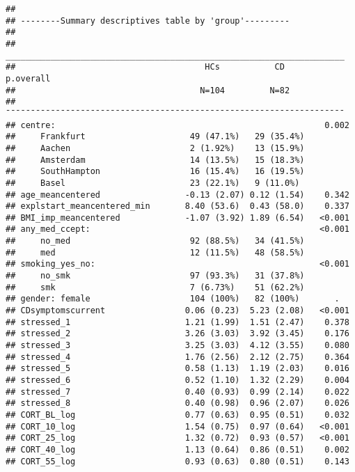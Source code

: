\documentclass[
]{article}
\begin{document}
\begin{verbatim}
## 
## --------Summary descriptives table by 'group'---------
## 
## ____________________________________________________________________ 
##                                      HCs           CD      p.overall 
##                                     N=104         N=82               
## ¯¯¯¯¯¯¯¯¯¯¯¯¯¯¯¯¯¯¯¯¯¯¯¯¯¯¯¯¯¯¯¯¯¯¯¯¯¯¯¯¯¯¯¯¯¯¯¯¯¯¯¯¯¯¯¯¯¯¯¯¯¯¯¯¯¯¯¯ 
## centre:                                                      0.002   
##     Frankfurt                     49 (47.1%)   29 (35.4%)            
##     Aachen                        2 (1.92%)    13 (15.9%)            
##     Amsterdam                     14 (13.5%)   15 (18.3%)            
##     SouthHampton                  16 (15.4%)   16 (19.5%)            
##     Basel                         23 (22.1%)   9 (11.0%)             
## age_meancentered                 -0.13 (2.07) 0.12 (1.54)    0.342   
## explstart_meancentered_min       8.40 (53.6)  0.43 (58.0)    0.337   
## BMI_imp_meancentered             -1.07 (3.92) 1.89 (6.54)   <0.001   
## any_med_ccept:                                              <0.001   
##     no_med                        92 (88.5%)   34 (41.5%)            
##     med                           12 (11.5%)   48 (58.5%)            
## smoking_yes_no:                                             <0.001   
##     no_smk                        97 (93.3%)   31 (37.8%)            
##     smk                           7 (6.73%)    51 (62.2%)            
## gender: female                    104 (100%)   82 (100%)       .     
## CDsymptomscurrent                0.06 (0.23)  5.23 (2.08)   <0.001   
## stressed_1                       1.21 (1.99)  1.51 (2.47)    0.378   
## stressed_2                       3.26 (3.03)  3.92 (3.45)    0.176   
## stressed_3                       3.25 (3.03)  4.12 (3.55)    0.080   
## stressed_4                       1.76 (2.56)  2.12 (2.75)    0.364   
## stressed_5                       0.58 (1.13)  1.19 (2.03)    0.016   
## stressed_6                       0.52 (1.10)  1.32 (2.29)    0.004   
## stressed_7                       0.40 (0.93)  0.99 (2.14)    0.022   
## stressed_8                       0.40 (0.98)  0.96 (2.07)    0.026   
## CORT_BL_log                      0.77 (0.63)  0.95 (0.51)    0.032   
## CORT_10_log                      1.54 (0.75)  0.97 (0.64)   <0.001   
## CORT_25_log                      1.32 (0.72)  0.93 (0.57)   <0.001   
## CORT_40_log                      1.13 (0.64)  0.86 (0.51)    0.002   
## CORT_55_log                      0.93 (0.63)  0.80 (0.51)    0.143   

\end{verbatim}
\end{document}
